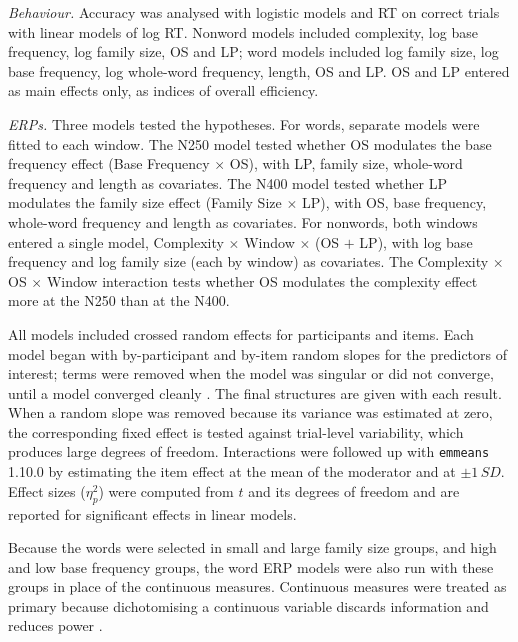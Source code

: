\textit{Behaviour.} Accuracy was analysed with logistic models and RT on correct
trials with linear models of log RT. Nonword models included complexity, log
base frequency, log family size, OS and LP; word models included log family
size, log base frequency, log whole-word frequency, length, OS and LP. OS and LP
entered as main effects only, as indices of overall efficiency.

\textit{ERPs.} Three models tested the hypotheses. For words, separate models
were fitted to each window. The N250 model tested whether OS modulates the base
frequency effect (Base Frequency $\times$ OS), with LP, family size, whole-word
frequency and length as covariates. The N400 model tested whether LP modulates
the family size effect (Family Size $\times$ LP), with OS, base frequency,
whole-word frequency and length as covariates. For nonwords, both windows entered
a single model, Complexity $\times$ Window $\times$ (OS $+$ LP), with log base
frequency and log family size (each by window) as covariates. The Complexity
$\times$ OS $\times$ Window interaction tests whether OS modulates the complexity
effect more at the N250 than at the N400.

All models included crossed random effects for participants and items. Each model
began with by-participant and by-item random slopes for the predictors of
interest; terms were removed when the model was singular or did not converge,
until a model converged cleanly \citep{matuschekBalancingTypeError2017}. %
The final structures are given with each result. When a random slope was removed
because its variance was estimated at zero, the corresponding fixed effect is
tested against trial-level variability, which produces large degrees of freedom.
Interactions were followed up with \texttt{emmeans} 1.10.0
\citep{lenthEmmeansEstimatedMarginal2023} %
by estimating the item effect at the mean of the moderator and at $\pm 1\,SD$.
Effect sizes ($\eta^2_p$) were computed from $t$ and its degrees of freedom and
are reported for significant effects in linear models.

Because the words were selected in small and large family size groups, and high
and low base frequency groups, the word ERP models were also run with these
groups in place of the continuous measures. Continuous measures were treated as
primary because dichotomising a continuous variable discards information and
reduces power \citep{maccallumPracticeDichotomizationQuantitative2002}. %

